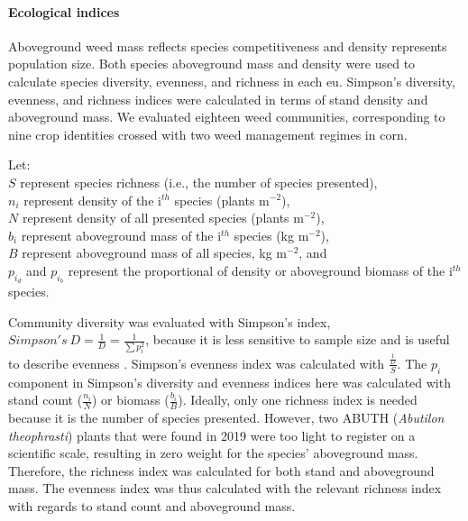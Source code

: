 \documentclass[
]{article}
\begin{document}
\hypertarget{ecological-indices}{%
\paragraph*{Ecological indices}\label{ecological-indices}}

Aboveground weed mass reflects species competitiveness and density represents population size. Both species aboveground mass and density were used to calculate species diversity, evenness, and richness in each eu. Simpson's diversity, evenness, and richness indices were calculated in terms of stand density and aboveground mass. We evaluated eighteen weed communities, corresponding to nine crop identities crossed with two weed management regimes in corn.

Let:\\
\(S\) represent species richness (i.e., the number of species presented),\\
\(n_i\) represent density of the i\(^{th}\) species (plants m\(^{-2}\)),\\
\(N\) represent density of all presented species (plants m\(^{-2}\)),\\
\(b_i\) represent aboveground mass of the i\(^{th}\) species (kg m\(^{-2}\)),\\
\(B\) represent aboveground mass of all species, kg m\(^{-2}\), and\\
\(p_{i_d}\) and \(p_{i_b}\) represent the proportional of density or aboveground biomass of the i\(^{th}\) species.

Community diversity was evaluated with Simpson's index, \(Simpson's\ D = \frac{1}{D} = \frac{1}{\sum p_i^2}\), because it is less sensitive to sample size and is useful to describe evenness \citep{nkoaWeedAbundanceDistribution2015}. Simpson's evenness index was calculated with \(\frac{\frac{1}{D}}{S}\). The \(p_i\) component in Simpson's diversity and evenness indices here was calculated with stand count (\(\frac{n_i}{N}\)) or biomass (\(\frac{b_i}{B}\)). Ideally, only one richness index is needed because it is the number of species presented. However, two ABUTH (\emph{Abutilon theophrasti}) plants that were found in 2019 were too light to register on a scientific scale, resulting in zero weight for the species' aboveground mass. Therefore, the richness index was calculated for both stand and aboveground mass. The evenness index was thus calculated with the relevant richness index with regards to stand count and aboveground mass.
\end{document}
